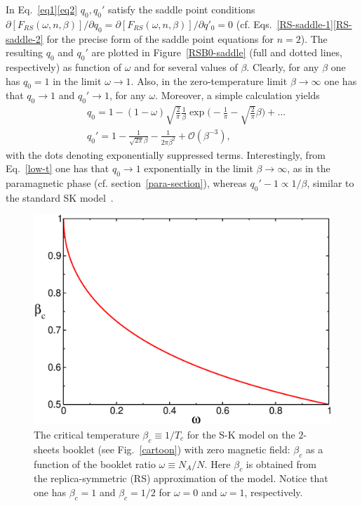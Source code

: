 \documentclass[twocolumn,superscriptaddress,prb,10pt]{revtex4-1}
\begin{document}
In Eq.~\eqref{eq1}\eqref{eq2} $q_0,q_0'$ satisfy the saddle point conditions 
$\partial[F_{RS}(\omega,n,\beta)]/\partial q_0=\partial[F_{RS}(\omega,n,\beta)]/
\partial q'_0=0$ (cf. Eqs.~\eqref{RS-saddle-1}\eqref{RS-saddle-2} for the precise 
form of the saddle point equations for $n=2$). 
The resulting $q_0$ and $q_0'$ are plotted in Figure~\ref{RSB0-saddle} (full 
and dotted lines, respectively) as function of $\omega$ and for several values of 
$\beta$. Clearly, for any $\beta$ one has $q_0=1$ in the limit $\omega\to 1$. Also, 
in the zero-temperature limit $\beta\to\infty$ one has that $q_0\to 1$ 
and $q_0'\to 1$, for any $\omega$. Moreover, a simple calculation yields  
%
\begin{align}
\label{low-t}
& q_0=1 -(1-\omega)\sqrt{\frac{2}{\pi}}\frac{1}{\beta}\exp\Big(-\frac{1}{\pi}-
\sqrt{\frac{2}{\pi}}\beta\Big)+\dots
\\ 
& q_0'=1-\frac{1}{\sqrt{2\pi}\beta}-\frac{1}{2\pi\beta^2}+{\mathcal O}(\beta^{-3}),
\end{align}
%
with the dots denoting exponentially suppressed terms. Interestingly, from 
Eq.~\eqref{low-t} one has that $q_0\to 1$ exponentially in the limit $\beta\to\infty$, 
as in the paramagnetic phase (cf. section~\ref{para-section}), whereas 
$q_0'-1\propto 1/\beta$, similar to the standard SK model~\cite{nishimori-book}. 


\begin{figure}[t]
\includegraphics*[width=0.9\linewidth]{./draft_figs/betac}
\caption{
 The critical temperature $\beta_c\equiv 1/T_c$ for the S-K model on the $2$-sheets  
 booklet (see Fig.~\ref{cartoon}) with zero magnetic field: $\beta_c$ as a function 
 of the booklet ratio $\omega\equiv N_A/N$. Here $\beta_c$  is obtained from the 
 replica-symmetric (RS) approximation of the model. Notice that one has $\beta_c=1$ 
 and $\beta_c=1/2$ for $\omega=0$ and $\omega=1$, respectively. 
}
\label{beta_c}
\end{figure}
\end{document}
